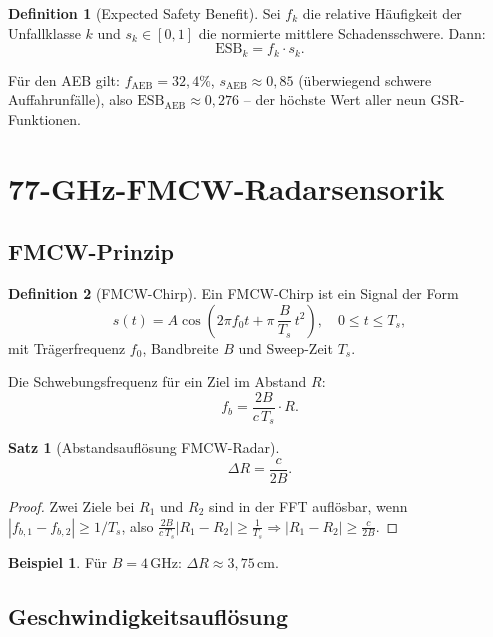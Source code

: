 ﻿\documentclass[a4paper,12pt]{article}
\theoremstyle{definition}
\newtheorem{definition}{Definition}
\newtheorem{beispiel}{Beispiel}
\newtheorem{satz}{Satz}
\begin{document}
\begin{definition}[Expected Safety Benefit]
\label{def:esb}
Sei $f_k$ die relative H\"aufigkeit der Unfallklasse $k$ und
$s_k \in [0,1]$ die normierte mittlere Schadensschwere. Dann:
\[
\mathrm{ESB}_k = f_k \cdot s_k.
\]
\end{definition}

F\"ur den AEB gilt: $f_\mathrm{AEB} = 32{,}4\%$, $s_\mathrm{AEB} \approx 0{,}85$
(\"uberwiegend schwere Auffahrunf\"alle), also
$\mathrm{ESB}_\mathrm{AEB} \approx 0{,}276$ -- der h\"ochste Wert aller
neun GSR-Funktionen.

\section{77-GHz-FMCW-Radarsensorik}
\label{sec:radar}

\subsection{FMCW-Prinzip}

\begin{definition}[FMCW-Chirp]
Ein FMCW-Chirp ist ein Signal der Form
\[
s(t) = A\cos\!\left(2\pi f_0 t + \pi\,\frac{B}{T_s}\,t^2\right),
\quad 0 \le t \le T_s,
\]
mit Tr\"agerfrequenz $f_0$, Bandbreite $B$ und Sweep-Zeit $T_s$.
\end{definition}

Die Schwebungsfrequenz f\"ur ein Ziel im Abstand $R$:
\[
f_b = \frac{2B}{c\,T_s}\cdot R.
\]

\begin{satz}[Abstandsaufl\"osung FMCW-Radar]
\label{satz:range_res}
\[
\Delta R = \frac{c}{2B}.
\]
\end{satz}

\begin{proof}
Zwei Ziele bei $R_1$ und $R_2$ sind in der FFT aufl\"osbar, wenn
$|f_{b,1}-f_{b,2}| \ge 1/T_s$, also
$\frac{2B}{c\,T_s}|R_1-R_2| \ge \frac{1}{T_s}
\Rightarrow |R_1-R_2| \ge \frac{c}{2B}$.\qedhere
\end{proof}

\begin{beispiel}
F\"ur $B = 4$\,GHz: $\Delta R \approx 3{,}75$\,cm.
\end{beispiel}

\subsection{Geschwindigkeitsaufl\"osung}
\end{document}
